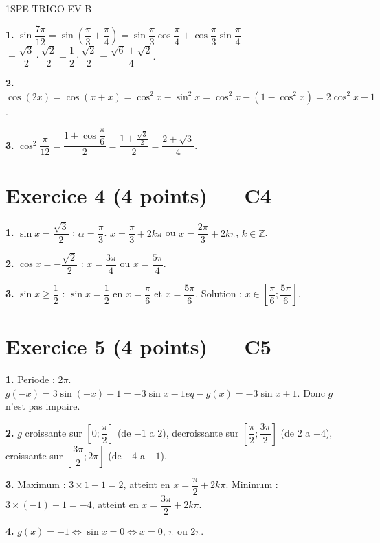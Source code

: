\begin{corrige}{1SPE-TRIGO-EV-B}

\textbf{1.} $\sin\dfrac{7\pi}{12} = \sin\!\left(\dfrac{\pi}{3}+\dfrac{\pi}{4}\right) = \sin\dfrac{\pi}{3}\cos\dfrac{\pi}{4} + \cos\dfrac{\pi}{3}\sin\dfrac{\pi}{4}$
$= \dfrac{\sqrt{3}}{2}\cdot\dfrac{\sqrt{2}}{2} + \dfrac{1}{2}\cdot\dfrac{\sqrt{2}}{2} = \dfrac{\sqrt{6}+\sqrt{2}}{4}$.

\textbf{2.} $\cos(2x) = \cos(x+x) = \cos^2 x - \sin^2 x = \cos^2 x - (1-\cos^2 x) = 2\cos^2 x - 1$.

\textbf{3.} $\cos^2\dfrac{\pi}{12} = \dfrac{1+\cos\dfrac{\pi}{6}}{2} = \dfrac{1+\frac{\sqrt{3}}{2}}{2} = \dfrac{2+\sqrt{3}}{4}$.

\section*{Exercice 4 \hfill (4 points) — C4}


\textbf{1.} $\sin x = \dfrac{\sqrt{3}}{2}$ : $\alpha = \dfrac{\pi}{3}$. $x = \dfrac{\pi}{3} + 2k\pi$ ou $x = \dfrac{2\pi}{3} + 2k\pi$, $k \in \mathbb{Z}$.

\textbf{2.} $\cos x = -\dfrac{\sqrt{2}}{2}$ : $x = \dfrac{3\pi}{4}$ ou $x = \dfrac{5\pi}{4}$.

\textbf{3.} $\sin x \geqslant \dfrac{1}{2}$ : $\sin x = \dfrac{1}{2}$ en $x = \dfrac{\pi}{6}$ et $x = \dfrac{5\pi}{6}$.
Solution : $x \in \left[\dfrac{\pi}{6};\dfrac{5\pi}{6}\right]$.

\section*{Exercice 5 \hfill (4 points) — C5}


\textbf{1.} Periode : $2\pi$. $g(-x) = 3\sin(-x) - 1 = -3\sin x - 1 
eq -g(x) = -3\sin x + 1$. Donc $g$ n'est pas impaire.

\textbf{2.} $g$ croissante sur $\left[0;\dfrac{\pi}{2}\right]$ (de $-1$ a $2$), decroissante sur $\left[\dfrac{\pi}{2};\dfrac{3\pi}{2}\right]$ (de $2$ a $-4$), croissante sur $\left[\dfrac{3\pi}{2};2\pi\right]$ (de $-4$ a $-1$).

\textbf{3.} Maximum : $3 \times 1 - 1 = 2$, atteint en $x = \dfrac{\pi}{2} + 2k\pi$. Minimum : $3 \times (-1) - 1 = -4$, atteint en $x = \dfrac{3\pi}{2} + 2k\pi$.

\textbf{4.} $g(x) = -1 \iff \sin x = 0 \iff x = 0$, $\pi$ ou $2\pi$.

\end{corrige}
